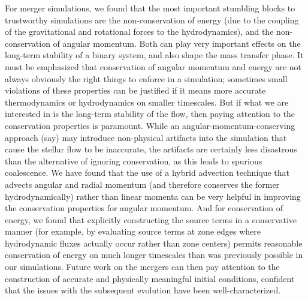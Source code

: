 \documentclass[12pt]{article}
\begin{document}
For merger simulations, we found that the most important stumbling blocks to trustworthy
simulations are the non-conservation of energy (due to the coupling of the gravitational
and rotational forces to the hydrodynamics), and the non-conservation of angular momentum.
Both can play very important effects on the long-term stability of a binary system, and
also shape the mass transfer phase. It must be emphasized that conservation of angular momentum
and energy are not always obviously the right things to enforce in a simulation; sometimes
small violations of these properties can be justified if it means more accurate thermodynamics
or hydrodynamics on smaller timescales. But if what we are interested in is the long-term
stability of the flow, then paying attention to the conservation properties is paramount.
While an angular-momentum-conserving approach (say) may introduce non-physical artifacts into
the simulation that cause the stellar flow to be inaccurate, the artifacts are certainly less disastrous
than the alternative of ignoring conservation, as this leads to spurious coalescence.
We have found that the use of a hybrid advection technique that advects angular and radial
momentum (and therefore conserves the former hydrodynamically) rather than linear momenta
can be very helpful in improving the conservation properties for angular momentum. And for
conservation of energy, we found that explicitly constructing the source terms in a conservative
manner (for example, by evaluating source terms at zone edges where hydrodynamic fluxes actually
occur rather than zone centers) permits reasonable conservation of energy on much longer
timescales than was previously possible in our simulations. Future work on the mergers can then
pay attention to the construction of accurate and physically meaningful initial conditions,
confident that the issues with the subsequent evolution have been well-characterized.
\end{document}
